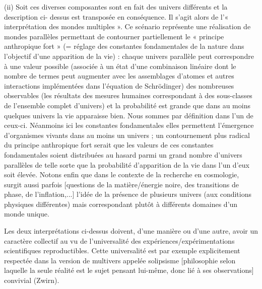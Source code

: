 (ii) Soit ces diverses composantes sont en fait des univers différents et la description ci-
dessus est transposée en conséquence. Il s’agit alors de l’« interprétation des mondes
multiples ». Ce scénario représente une réalisation de mondes parallèles permettant de
contourner partiellement le « principe anthropique fort » (= réglage des constantes
fondamentales de la nature dans l’objectif d’une apparition de la vie) : chaque univers
parallèle peut correspondre à une valeur possible (associée à un état d’une combinaison
linéaire dont le nombre de termes peut augmenter avec les assemblages d’atomes et autres
interactions implémentées dans l’équation de Schrödinger) des nombreuses observables (les
résultats des mesures humaines correspondant à des sous-classes de l’ensemble complet
d’univers) et la probabilité est grande que dans au moins quelques univers la vie apparaisse
bien. Nous sommes par définition dans l’un de ceux-ci. Néanmoins ici les constantes
fondamentales elles permettent l’émergence d’organismes vivants dans au moins un
univers ; un contournement plus radical du principe anthropique fort serait que les valeurs
de ces constantes fondamentales soient distribuées au hasard parmi un grand nombre
d’univers parallèles de telle sorte que la probabilité d’apparition de la vie dans l’un d’eux
soit élevée. Notons enfin que dans le contexte de la recherche en cosmologie, surgit aussi
parfois [questions de la matière/énergie noire, des transitions de phase, de l’inflation,...]
l’idée de la présence de plusieurs univers (aux conditions physiques différentes) mais
correspondant plutôt à différents domaines d’un monde unique.

Les deux interprétations ci-dessus doivent, d’une manière ou d’une autre, avoir un caractère
collectif au vu de l’universalité des expériences/expérimentations scientifiques
reproductibles. Cette universalité est par exemple explicitement respectée dans la version de
multivers appelée solipsisme [philosophie selon laquelle la seule réalité est le sujet pensant
lui-même, donc lié à ses observations] convivial (Zwirn).

